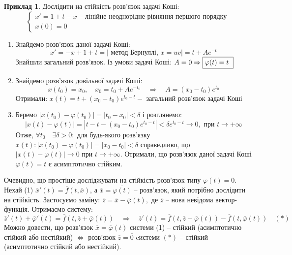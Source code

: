 \documentclass[14pt,a4paper]{scrartcl}
\theoremstyle{definition}
\newtheorem*{example}{Приклад}
\theoremstyle{definition}
\theoremstyle{definition}
\begin{document}
\begin{example}
    Дослідити на стійкість розв'язок  задачі Коші:
    $$
    \begin{cases}
        x' = 1 + t - x \text{  -- лінійне неоднорідне рівняння першого порядку}\\
        x(0) = 0
    \end{cases}
    $$
    \begin{enumerate}

    \item Знайдемо розв'язок даної задачі Коші:
    $$
    x' = - x + 1 + t = \left| \text{ метод Бернуллі, } x = uv \right| = t + Ae^{-t}
    $$
    Знайшли загальний розв'язок. Із умови задачі Коші: $ A = 0 \Rightarrow \fbox {$\varphi(t) = t$ }$

    \item Знайдемо розв'язок довільної задачі Коші:
    $$
    x(t_0) = x_0, \quad x_0 = t_0 + Ae^{-t_0} \quad \Rightarrow \quad A = (x_0 - t_0) e^{t_0}
    $$
    Отримали: $x(t) = t + (x_0 - t_0) e^{t_0 - t} - \text{ загальний розв'язок задачі Коші}$

    \item Беремо $\left| x(t_0) - \varphi(t_0) \right| = |t_0 - x_0| < \delta$ і розглянемо:
    $$\left| x(t) - \varphi(t) \right| = |t - t - (x_0 - t_0)e^{t_0 - t}| < \delta e^{t_0 - t} \rightarrow 0, \text{ при } t \rightarrow + \infty$$
    Отже, $\forall t_0 \quad \exists \delta > 0 :$ для будь-якого розв'язку $x(t): |x(t_0) - \varphi(t_0)| = |x_0 - t_0| < \delta$ справедливо, що $|x(t) - \varphi(t)| \rightarrow 0 \text{ при } t \rightarrow + \infty$. Отримали, що розв'язок даної задачі Коші $\varphi(t) = t$ є асимптотично стійким.
    \end{enumerate}
\end{example}

\remark
Очевидно, що простіше досліджувати на стійкість розв'язок типу $\varphi(t) = 0$. Нехай (1) $\overline{x}'(t) = \overline{f}(t, \overline{x})$, а $\overline{x} = \overline{\varphi(t)}$ -- розв'язок, який потрібно дослідити на стійкість. Застосуємо заміну: $\overline{z} = \overline{x} - \overline{\varphi}(t), \text{ де } \overline{z}$ -- нова невідома вектор-функція. Отримаємо систему:
$$
\overline{z}'(t) + \overline{\varphi}'(t) = \overline{f}(t, \overline{z} + \overline{\varphi}(t)) \quad \Rightarrow \quad \overline{z}'(t) = \overline{f}(t, \overline{z} + \overline{\varphi}(t)) - \overline{f}(t, \overline{\varphi}(t)) \quad (*)
$$
Можно довести, що розв'язок $\overline{x} = \overline{\varphi}(t)$ системи (1) -- стійкий (асимптотично стійкий або нестійкий) $\Longleftrightarrow$ розв'язок $\overline{z} = \overline{0}$  cистеми $(*)$ -- стійкий (асимптотично стійкий або нестійкий).
\end{document}
